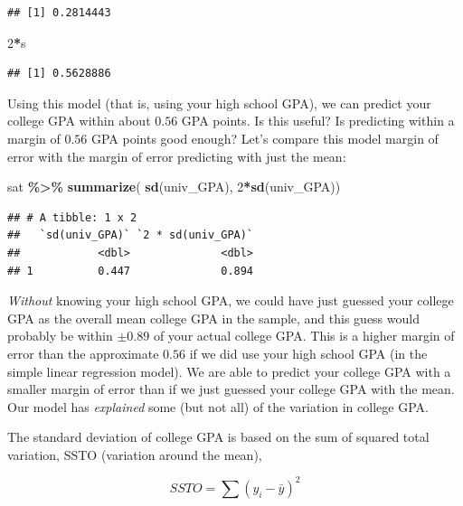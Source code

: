 \documentclass[
]{book}
\newenvironment{Shaded}{\begin{snugshade}}{\end{snugshade}}
\newcommand{\DecValTok}[1]{\textcolor[rgb]{0.00,0.00,0.81}{#1}}
\newcommand{\FunctionTok}[1]{\textcolor[rgb]{0.13,0.29,0.53}{\textbf{#1}}}
\newcommand{\NormalTok}[1]{#1}
\newcommand{\SpecialCharTok}[1]{\textcolor[rgb]{0.81,0.36,0.00}{\textbf{#1}}}
\begin{document}
\begin{verbatim}
## [1] 0.2814443
\end{verbatim}

\begin{Shaded}
\begin{Highlighting}[]
\DecValTok{2}\SpecialCharTok{*}\NormalTok{s}
\end{Highlighting}
\end{Shaded}

\begin{verbatim}
## [1] 0.5628886
\end{verbatim}

Using this model (that is, using your high school GPA), we can predict your college GPA within about \(0.56\) GPA points. Is this useful? Is predicting within a margin of \(0.56\) GPA points good enough? Let's compare this model margin of error with the margin of error predicting with just the mean:

\begin{Shaded}
\begin{Highlighting}[]
\NormalTok{sat }\SpecialCharTok{\%\textgreater{}\%}
  \FunctionTok{summarize}\NormalTok{(}
    \FunctionTok{sd}\NormalTok{(univ\_GPA), }
    \DecValTok{2}\SpecialCharTok{*}\FunctionTok{sd}\NormalTok{(univ\_GPA))}
\end{Highlighting}
\end{Shaded}

\begin{verbatim}
## # A tibble: 1 x 2
##   `sd(univ_GPA)` `2 * sd(univ_GPA)`
##            <dbl>              <dbl>
## 1          0.447              0.894
\end{verbatim}

\emph{Without} knowing your high school GPA, we could have just guessed your college GPA as the overall mean college GPA in the sample, and this guess would probably be within \(\pm 0.89\) of your actual college GPA. This is a higher margin of error than the approximate \(0.56\) if we did use your high school GPA (in the simple linear regression model). We are able to predict your college GPA with a smaller margin of error than if we just guessed your college GPA with the mean. Our model has \emph{explained} some (but not all) of the variation in college GPA.

The standard deviation of college GPA is based on the sum of squared total variation, SSTO (variation around the mean),

\[ SSTO = \sum{(y_i -\bar{y})^2} \]
\end{document}
